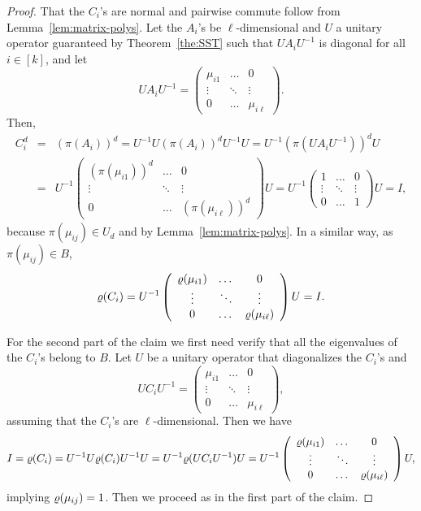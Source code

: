 \documentclass[11pt,letter]{article}
\begin{document}
\begin{proof}
That the $C_i$'s are normal and pairwise commute follow from Lemma~\ref{lem:matrix-polys}. Let the $A_i$'s be $\ell$-dimensional and $U$ a unitary operator guaranteed by Theorem~\ref{the:SST} such that $UA_iU^{-1}$ is diagonal for all $i\in[k]$, and let 
\[
UA_iU^{-1}=\left(\begin{array}{ccc}\mu_{i1}&\dots&0\\ \vdots&\ddots&\vdots\\ 0&\dots&\mu_{i\ell} \end{array}\right).
\]
Then,
\begin{eqnarray*}
C_i^d &=& (\pi(A_i))^d=U^{-1}U(\pi(A_i))^dU^{-1}U=U^{-1}(\pi(UA_iU^{-1}))^dU\\
&=& U^{-1}\left(\begin{array}{ccc}(\pi(\mu_{i1}))^d&\dots&0\\ \vdots&\ddots&\vdots\\ 0&\dots&(\pi(\mu_{i\ell}))^d \end{array}\right)U = U^{-1}\left(\begin{array}{ccc}1&\dots&0\\ \vdots&\ddots&\vdots\\ 0&\dots&1 \end{array}\right)U=I,
\end{eqnarray*}
 because $\pi(\mu_{ij})\in U_d$ and by Lemma~\ref{lem:matrix-polys}. In a similar way, as $\pi(\mu_{ij})\in B$,
 \[
 \varrho(C_i)= U^{-1}\left(\begin{array}{ccc}\varrho(\mu_{i1})&\dots&0\\ \vdots&\ddots&\vdots\\ 0&\dots&\varrho(\mu_{i\ell}) \end{array}\right)U=I.
 \]

For the second part of the claim we first need verify that all the eigenvalues of the $C_i$'s belong to $B$. Let $U$ be a unitary operator that diagonalizes the $C_i$'s and 
\[
UC_iU^{-1}=\left(\begin{array}{ccc}\mu_{i1}&\dots&0\\ \vdots&\ddots&\vdots\\ 0&\dots&\mu_{i\ell} \end{array}\right),
\]
assuming that the $C_i$'s are $\ell$-dimensional.  Then we have
\[
  I = \varrho(C_i) = U^{-1}U\varrho(C_i)U^{-1}U = U^{-1}\varrho(UC_iU^{-1})U = U^{-1}\left(\begin{array}{ccc}\varrho(\mu_{i1})&\dots&0\\ \vdots&\ddots&\vdots\\ 0&\dots&\varrho(\mu_{i\ell}) \end{array}\right)U,
\]
implying $\varrho(\mu_{ij})=1$. Then we proceed as in the first part of the claim.
\end{proof}
\end{document}
